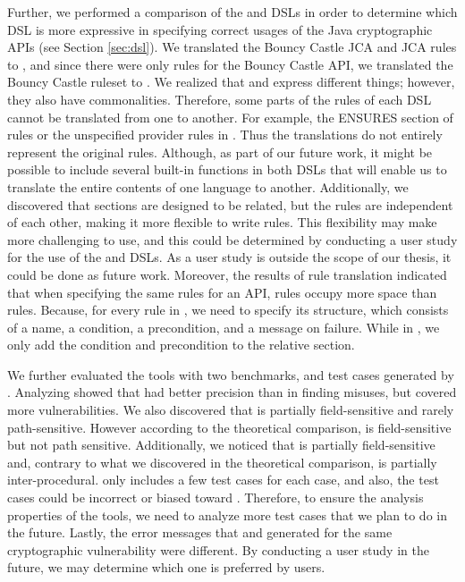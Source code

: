 Further, we performed a comparison of the \MARK{} and \crysl{} DSLs in order to determine which DSL is more expressive in specifying correct usages of the Java cryptographic APIs (see Section \ref{sec:dsl}). We translated the Bouncy Castle JCA and JCA \crysl{} rules to \MARK, and since there were only \MARK{} rules for the Bouncy Castle API, we translated the \MARK{} Bouncy Castle ruleset to \crysl. We realized that \crysl{} and \MARK{} express different things; however, they also have commonalities. Therefore, some parts of the rules of each DSL cannot be translated from one to another. For example, the ENSURES section of \crysl{} rules or the unspecified provider rules in \MARK. Thus the translations do not entirely represent the original rules. Although, as part of our future work, it might be possible to include several built-in functions in both DSLs that will enable us to translate the entire contents of one language to another. Additionally, we discovered that \crysl{} sections are designed to be related, but the \MARK{} rules are independent of each other, making it more flexible to write rules. This flexibility may make \MARK{} more challenging to use, and this could be determined by conducting a user study for the use of the \crysl{} and \MARK{} DSLs. As a user study is outside the scope of our thesis, it could be done as future work. Moreover, the results of rule translation indicated that when specifying the same rules for an API, \MARK{} rules occupy more space than \crysl{} rules. Because, for every rule in \MARK, we need to specify its structure, which consists of a name, a condition, a precondition, and a message on failure. While in \crysl, we only add the condition and precondition to the relative section.

We further evaluated the tools with two benchmarks, \cryptoapibench{} and test cases generated by \cognicrypttestgen. Analyzing \cryptoapibench{} showed that \codyze{} had better precision than \cognicryptsast{} in finding misuses, but \cognicryptsast{} covered more vulnerabilities. We also discovered that \cognicryptsast{} is partially field-sensitive and rarely path-sensitive. However according to the theoretical comparison, \cognicryptsast{} is field-sensitive but not path sensitive. Additionally, we noticed that \codyze{} is partially field-sensitive and, contrary to what we discovered in the theoretical comparison, is partially inter-procedural. \cryptoapibench{} only includes a few test cases for each case, and also, the test cases could be incorrect or biased toward \cryptoguard. Therefore, to ensure the analysis properties of the tools, we need to analyze more test cases that we plan to do in the future.
Lastly, the error messages that \cognicryptsast{} and \codyze{} generated for the same cryptographic vulnerability were different. By conducting a user study in the future, we may determine which one is preferred by users.

